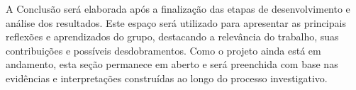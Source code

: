 A Conclusão será elaborada após a finalização das etapas de desenvolvimento e análise dos resultados. Este espaço será utilizado para apresentar as principais reflexões e aprendizados do grupo, destacando a relevância do trabalho, suas contribuições e possíveis desdobramentos. Como o projeto ainda está em andamento, esta seção permanece em aberto e será preenchida com base nas evidências e interpretações construídas ao longo do processo investigativo.